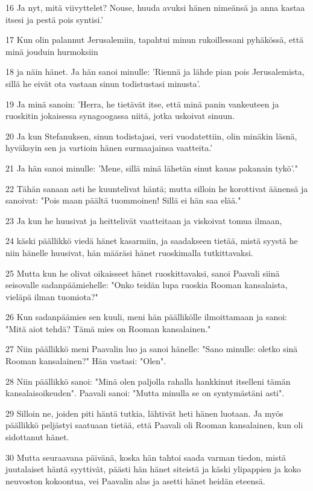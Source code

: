 \par 16 Ja nyt, mitä viivyttelet? Nouse, huuda avuksi hänen nimeänsä ja anna kastaa itsesi ja pestä pois syntisi.'
\par 17 Kun olin palannut Jerusalemiin, tapahtui minun rukoillessani pyhäkössä, että minä jouduin hurmoksiin
\par 18 ja näin hänet. Ja hän sanoi minulle: 'Riennä ja lähde pian pois Jerusalemista, sillä he eivät ota vastaan sinun todistustasi minusta'.
\par 19 Ja minä sanoin: 'Herra, he tietävät itse, että minä panin vankeuteen ja ruoskitin jokaisessa synagoogassa niitä, jotka uskoivat sinuun.
\par 20 Ja kun Stefanuksen, sinun todistajasi, veri vuodatettiin, olin minäkin läsnä, hyväksyin sen ja vartioin hänen surmaajainsa vaatteita.'
\par 21 Ja hän sanoi minulle: 'Mene, sillä minä lähetän sinut kauas pakanain tykö'."
\par 22 Tähän sanaan asti he kuuntelivat häntä; mutta silloin he korottivat äänensä ja sanoivat: "Pois maan päältä tuommoinen! Sillä ei hän saa elää."
\par 23 Ja kun he huusivat ja heittelivät vaatteitaan ja viskoivat tomua ilmaan,
\par 24 käski päällikkö viedä hänet kasarmiin, ja saadakseen tietää, mistä syystä he niin hänelle huusivat, hän määräsi hänet ruoskimalla tutkittavaksi.
\par 25 Mutta kun he olivat oikaisseet hänet ruoskittavaksi, sanoi Paavali siinä seisovalle sadanpäämiehelle: "Onko teidän lupa ruoskia Rooman kansalaista, vieläpä ilman tuomiota?"
\par 26 Kun sadanpäämies sen kuuli, meni hän päällikölle ilmoittamaan ja sanoi: "Mitä aiot tehdä? Tämä mies on Rooman kansalainen."
\par 27 Niin päällikkö meni Paavalin luo ja sanoi hänelle: "Sano minulle: oletko sinä Rooman kansalainen?" Hän vastasi: "Olen".
\par 28 Niin päällikkö sanoi: "Minä olen paljolla rahalla hankkinut itselleni tämän kansalaisoikeuden". Paavali sanoi: "Mutta minulla se on syntymästäni asti".
\par 29 Silloin ne, joiden piti häntä tutkia, lähtivät heti hänen luotaan. Ja myös päällikkö peljästyi saatuaan tietää, että Paavali oli Rooman kansalainen, kun oli sidottanut hänet.
\par 30 Mutta seuraavana päivänä, koska hän tahtoi saada varman tiedon, mistä juutalaiset häntä syyttivät, päästi hän hänet siteistä ja käski ylipappien ja koko neuvoston kokoontua, vei Paavalin alas ja asetti hänet heidän eteensä.

